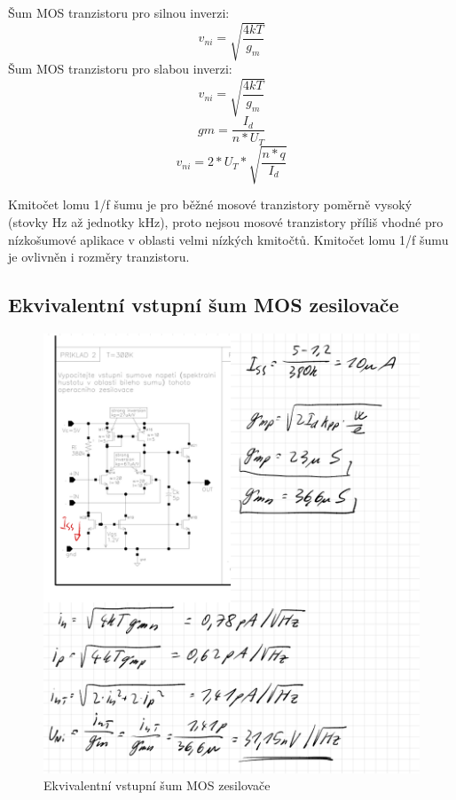 Šum MOS tranzistoru pro silnou inverzi:
\begin{equation}
v_{ni}=\sqrt{\frac{4kT}{g_{m}}}
\end{equation}
Šum MOS tranzistoru pro slabou inverzi:
\begin{equation}
v_{ni}=\sqrt{\frac{4kT}{g_{m}}}
\end{equation}
\begin{equation}
gm = \frac{I_{d}}{n*U_{T}}
\end{equation}
\begin{equation}
v_{ni}=2*U_{T}*\sqrt{\frac{n*q}{I_{d}}}
\end{equation}

Kmitočet lomu 1/f šumu je pro běžné mosové tranzistory poměrně vysoký (stovky Hz až
jednotky kHz), proto nejsou mosové tranzistory příliš vhodné pro nízkošumové aplikace
v oblasti velmi nízkých kmitočtů. Kmitočet lomu 1/f šumu je ovlivněn i rozměry tranzistoru.

\subsection{Ekvivalentní vstupní šum MOS zesilovače}
\begin{figure}[h]
   \begin{center}
     \includegraphics[scale=0.7]{images/Zes.png}
   \end{center}
   \caption{Ekvivalentní vstupní šum MOS zesilovače}
\end{figure}



